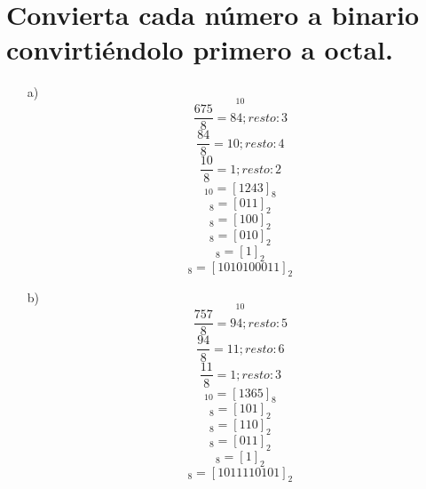 \documentclass{article}
\begin{document}
\section{Convierta cada número a binario convirtiéndolo primero a octal.}

\begin{enumerate}
\item[a)] \begin{equation*}[675]_{10}\end{equation*}\begin{equation*} \frac{675}{8} =  84;  resto: 3\end{equation*}\begin{equation*} \frac{84}{8} =  10;  resto: 4\end{equation*}\begin{equation*} \frac{10}{8} =  1;  resto: 2\end{equation*}\begin{equation*}[675]_{10} = [1243]_8\end{equation*} \begin{equation*} [3]_8 = [011]_2\end{equation*} \begin{equation*} [4]_8 = [100]_2\end{equation*}\begin{equation*} [2]_8 = [010]_2\end{equation*}\begin{equation*} [1]_8 = [1]_2\end{equation*}\begin{equation*} [1243]_8 = [1010100011]_2\end{equation*}
\item[b)] \begin{equation*}[757]_{10}\end{equation*}\begin{equation*} \frac{757}{8} =  94;  resto: 5\end{equation*}\begin{equation*} \frac{94}{8} =  11;  resto: 6\end{equation*}\begin{equation*} \frac{11}{8} =  1;  resto: 3\end{equation*}\begin{equation*}[757]_{10} = [1365]_8\end{equation*} \begin{equation*} [5]_8 = [101]_2\end{equation*} \begin{equation*} [6]_8 = [110]_2\end{equation*}\begin{equation*} [3]_8 = [011]_2\end{equation*}\begin{equation*} [1]_8 = [1]_2\end{equation*}\begin{equation*} [1365]_8 = [1011110101]_2\end{equation*}

\end{enumerate}
\end{document}
